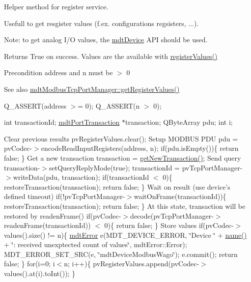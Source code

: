 Helper method for register service. 

Usefull to get resgister values (f.ex. configurations regsisters, ...).

Note: to get analog I/O values, the \hyperlink{classmdt_device}{mdtDevice} API should be used.

\begin{DoxyReturn}{Returns}
True on success. Values are the available with \hyperlink{classmdt_device_modbus_a83cb2a28111653fbcbbe748f7a1a2e3d}{registerValues()} 
\end{DoxyReturn}
\begin{DoxyPrecond}{Precondition}
address and n must be $>$ 0 
\end{DoxyPrecond}
\begin{DoxySeeAlso}{See also}
\hyperlink{classmdt_modbus_tcp_port_manager_ab5e780409492b5f56326a870bc4262ec}{mdtModbusTcpPortManager::getRegisterValues()} 
\end{DoxySeeAlso}


Q\_\-ASSERT(address $>$= 0); Q\_\-ASSERT(n $>$ 0);

int transactionId; \hyperlink{classmdt_port_transaction}{mdtPortTransaction} $\ast$transaction; QByteArray pdu; int i;

Clear previous results pvRegisterValues.clear(); Setup MODBUS PDU pdu = pvCodec-\/$>$encodeReadInputRegisters(address, n); if(pdu.isEmpty())\{ return false; \} Get a new transaction transaction = \hyperlink{classmdt_device_a0e57cc8b749581cff447d514b9a1ff8e}{getNewTransaction()}; Send query transaction-\/$>$setQueryReplyMode(true); transactionId = pvTcpPortManager-\/$>$writeData(pdu, transaction); if(transactionId $<$ 0)\{ restoreTransaction(transaction); return false; \} Wait on result (use device's defined timeout) if(!pvTcpPortManager-\/$>$waitOnFrame(transactionId))\{ restoreTransaction(transaction); return false; \} At this state, transaction will be restored by readenFrame() if(pvCodec-\/$>$decode(pvTcpPortManager-\/$>$readenFrame(transactionId)) $<$ 0)\{ return false; \} Store values if(pvCodec-\/$>$values().size() != n)\{ \hyperlink{classmdt_error}{mdtError} e(MDT\_\-DEVICE\_\-ERROR, \char`\"{}Device \char`\"{} + \hyperlink{classmdt_device_a7ad893c6885dbaef5a6cb980bfe627e0}{name()} + \char`\"{}: received unexptected count of values\char`\"{}, mdtError::Error); MDT\_\-ERROR\_\-SET\_\-SRC(e, \char`\"{}mdtDeviceModbusWago\char`\"{}); e.commit(); return false; \} for(i=0; i$<$n; i++)\{ pvRegisterValues.append(pvCodec-\/$>$values().at(i).toInt()); \}

